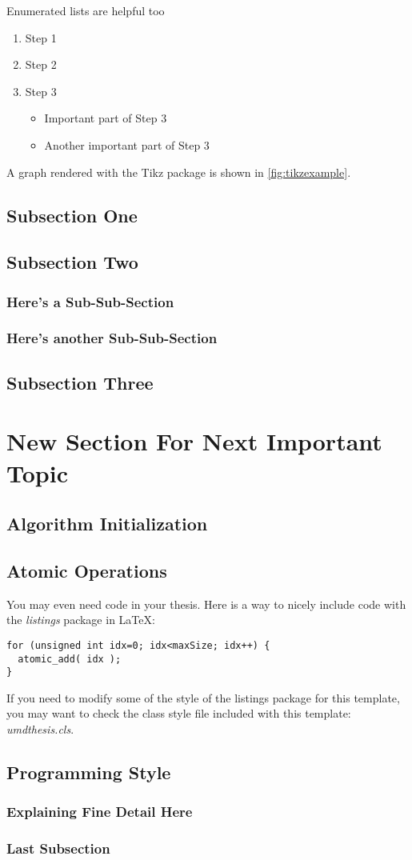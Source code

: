 Enumerated lists are helpful too
\begin{enumerate}
\item Step 1
\item Step 2
\item Step 3
\begin{itemize}
\item Important part of Step 3
\item Another important part of Step 3
\end{itemize}
\end{enumerate}

A graph rendered with the Tikz package is shown in \autoref{fig:tikzexample}.

\subsection{Subsection One}
\subsection{Subsection Two}
\subsubsection{Here's a Sub-Sub-Section}
\subsubsection{Here's another Sub-Sub-Section}
\subsection{Subsection Three}

\section{New Section For Next Important Topic}

\subsection{Algorithm Initialization}
\subsection{Atomic Operations}

You may even need code in your thesis. Here is a way to nicely include code with the \textit{listings} package in \LaTeX:
{\singlespace
\begin{lstlisting}
for (unsigned int idx=0; idx<maxSize; idx++) {
  atomic_add( idx );
}
\end{lstlisting}
}
If you need to modify some of the style of the listings package for this template, you may want to check the class style file included with this template: \textit{umdthesis.cls}.

\subsection{Programming Style}
\subsubsection{Explaining Fine Detail Here}


\subsubsection{Last Subsection}
